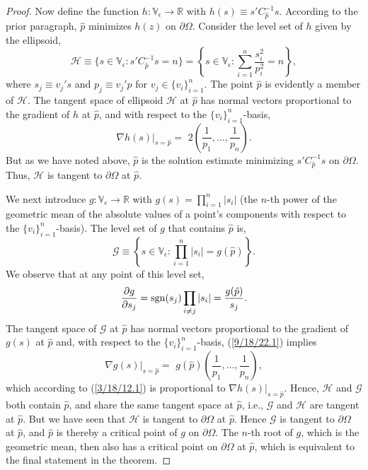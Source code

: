\documentclass{amsart}
\numberwithin{equation}{section}
\theoremstyle{definition}
\numberwithin{theorem}{section}
\begin{document}
{\begin{proof}
Now define the function  $h:\mathbb{V}_\epsilon\rightarrow \mathbb{R}$ with $h(s) \equiv s'C^{-1}_{\hat{p}} s$. According to the prior paragraph, $\hat{p}$ minimizes $h(z)$ on  $\partial\Omega$.   Consider the level set of $h$ given by the ellipsoid, \[ \mathcal{H} \equiv \{s\in \mathbb{V}_\epsilon: s'C_{\hat{p}}^{-1} s = n \} = \left\{s\in\mathbb{V}_\epsilon: \sum_{i=1}^n \frac{s_i^2}{p_i^2} = n\right\},\] where $s_j\equiv v_j's$ and  $p_j\equiv v_j'p$ for $v_j\in \{v_i\}_{i=1}^n$.  
The point $\hat{p}$ is evidently a member of $\mathcal{H}$.  The tangent space of ellipsoid $\mathcal{H}$ at $\hat{p}$  has normal vectors proportional to the gradient of $h$ at $\hat{p}$, and with respect to the $\{v_i\}_{i=1}^n$-basis,
\begin{equation}\label{3/18/12.1}  \nabla h(s)\Big|_{s=\hat{p}} = \,\, 2\left(\frac{1}{p_1},\dots, \frac{1}{p_n}\right).\end{equation} But as we have noted above, $\hat{p}$ is the solution estimate minimizing $s'C^{-1}_{\hat{p}} s$ on $\partial\Omega$.  Thus, $\mathcal{H}$ is tangent to $\partial\Omega$ at $\hat{p}$.  
 
We next introduce  $g:\mathbb{V}_\epsilon\rightarrow \mathbb{R}$ with $g(s) = \prod_{i=1}^n |s_i|$ (the $n$-th power of the geometric mean of the absolute values of a point's components with respect to the $\{v_i\}_{i=1}^n$-basis).  The level set of $g$ that contains $\hat{p}$ is,  \[\mathcal{G} \equiv \left\{ s\in \mathbb{V}_\epsilon:\prod_{i=1}^n |s_i| = g(\hat{p})\right\}.\] We observe that at any point of this level set,
   \begin{equation}\label{9/18/22.1} \frac{\partial g}{\partial s_j} = {\rm sgn}(s_j) \prod_{i\ne j} |s_i| = \frac{g(\hat{p})}{s_j}.\end{equation} The tangent space of $\mathcal{G}$ at $\hat{p}$ has normal vectors proportional to the gradient of $g(s)$ at $\hat{p}$ and, with respect to the $\{v_i\}_{i=1}^n$-basis, (\ref{9/18/22.1}) implies \begin{equation}\label{9/15/20.1} \nabla g(s)\Big|_{s=\hat{p}} = \,\, g(\hat{p}) \left(\frac{1}{p_1},\dots, \frac{1}{p_n}\right),\end{equation} which according to (\ref{3/18/12.1}) is proportional to $\nabla h(s)\big|_{s=\hat{p}}$.
Hence, $\mathcal{H}$ and $\mathcal{G}$ both contain $\hat{p}$, and share the same tangent space at $\hat{p}$, i.e., $\mathcal{G}$ and $\mathcal{H}$ are tangent at $\hat{p}$.  But we have seen that $\mathcal{H}$ is tangent to $\partial\Omega$ at $\hat{p}$.  Hence $\mathcal{G}$ is tangent to $\partial\Omega$ at $\hat{p}$, and $\hat{p}$ is thereby a critical point of $g$ on $\partial\Omega$.  The $n$-th root of $g$, which is the geometric mean, then also has a critical point on $\partial\Omega$ at $\hat{p}$, which is equivalent to the final statement in the theorem. 
 \end{proof} 
 
}
\end{document}
